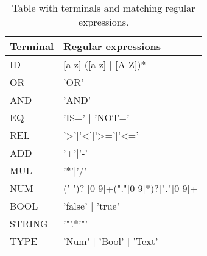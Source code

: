 \begin{table}[]
\centering
\label{fig:Lexicon}
\begin{tabular}{|l|l|}
\hline
Terminal & Regular expressions                \\ \hline
ID       & {[}a-z{]} ({[}a-z{]} | {[}A-Z{]})* \\ \hline
OR		 & 'OR'								  \\ \hline
AND		 & 'AND'							  \\ \hline
EQ		 & 'IS=' | 'NOT='					  \\ \hline
REL		 & '>'|'<'|'>='|'<='					  \\ \hline
ADD		 & '+'|'-'							  \\ \hline
MUL		 & '*'|'/'							  \\ \hline
NUM		 & ('-')? [0-9]+("."[0-9]*)?|"."[0-9]+\\ \hline
BOOL 	 & 'false' | 'true'					  \\ \hline
STRING 	 & '"'.*'"'						      \\ \hline
TYPE     & 'Num' | 'Bool' | 'Text'            \\ \hline


\end{tabular}
\caption{Table with terminals and matching regular expressions.}
\end{table}
